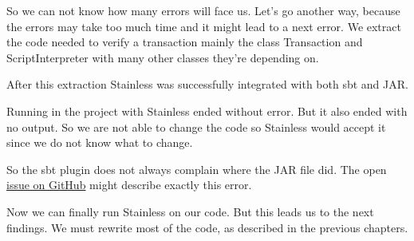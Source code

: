 So we can not know how many errors will face us.
Let's go another way, because the errors may take too much time and it might lead to a next error.
We extract the code needed to verify a transaction mainly the class Transaction and ScriptInterpreter with many other classes they're depending on.

After this extraction Stainless was successfully integrated with both sbt and JAR.

Running  in the project with Stainless ended without error.
But it also ended with no output.
So we are not able to change the code so Stainless would accept it since we do not know what to change.

So the sbt plugin does not always complain where the JAR file did.
The open \href{https://github.com/epfl-lara/stainless/issues/484}{issue  on GitHub} might describe exactly this error.

Now we can finally run Stainless on our code.
But this leads us to the next findings.
We must rewrite most of the code, as described in the previous chapters.
